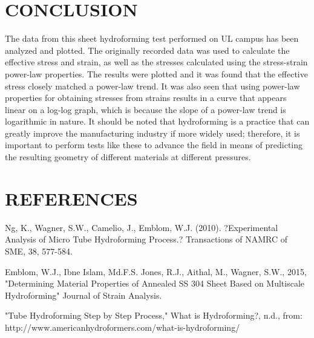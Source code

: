 \documentclass[12pt]{article}
\begin{document}
\section*{\fontsize{12}{12}\selectfont CONCLUSION}
The data from this sheet hydroforming test performed on UL campus has been analyzed and plotted. The originally recorded data was used to calculate the effective stress and strain, as well as the stresses calculated using the stress-strain power-law properties. The results were plotted and it was found that the effective stress closely matched a power-law trend. It was also seen that using power-law properties for obtaining stresses from strains results in a curve that appears linear on a log-log graph, which is because the slope of a power-law trend is logarithmic in nature. It should be noted that hydroforming is a practice that can greatly improve the manufacturing industry if more widely used; therefore, it is important to perform tests like these to advance the field in means of predicting the resulting geometry of different materials at different pressures.

\bigskip


\section*{\fontsize{12}{12}\selectfont REFERENCES}

\begin{thebibliography}{2}

Ng, K., Wagner, S.W., Camelio, J., Emblom, W.J. (2010). ?Experimental Analysis of Micro Tube
Hydroforming Process.? Transactions of NAMRC of SME, 38, 577-584.


Emblom, W.J., Ibne Islam, Md.F.S. Jones, R.J., Aithal, M., Wagner, S.W., 2015,
"Determining Material Properties of Annealed SS 304 Sheet Based on Multiscale
Hydroforming" Journal of Strain Analysis. 


"Tube Hydroforming Step by Step Process," What is Hydroforming?, n.d., from:
http://www.americanhydroformers.com/what-is-hydroforming/
%
%

\end{thebibliography}


\end{document}
